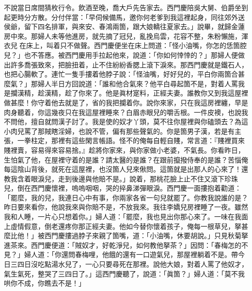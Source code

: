 不說當日席間猜枚行令。飲酒至晚，喬大戶先告家去。西門慶陪吳大舅、伯爵坐到起更時分方散。分付伴當：「早伺候備馬，邀你何老爹到我這裡起身，同往郊外送侯爺，留下四名排軍，與來安、春鴻兩箇，跟大娘轎往夏家去。」說畢，就歸金蓮房中來。那婦人未等他進房，就先摘了冠兒，亂挽烏雲，花容不整，朱粉懶施，渾衣兒𢱉在床上，叫着只不做聲。西門慶便坐在床上問道：「怪小油嘴，你怎的恁箇腔兒？」也不答應。被西門慶用手拉起他來，說道：「你如何悻悻的？」那婦人便做出許多喬張致來，把臉扭着，止不住紛紛香腮上滾下淚來。那西門慶就是鐵石人，也把心腸軟了。{}連忙一隻手摟着他脖子說：「怪油嘴，好好兒的，平白你兩箇合甚麼氣？」那婦人半日方回說道：「誰和他合氣來？他平白尋起箇不是，對着人罵我是攔漢精，趁漢精，{}趁了你來了。他是眞材寔料，正經夫妻。誰教你又到我這屋裡做甚麼！你守着他去就是了，省的我把攔着你。說你來家，只在我這房裡纏，早是肉身聽着，你這幾夜只在我這屋裡睡來？白眉赤眼兒的嚼舌根。一件皮襖，也說我不問他，擅自就問漢子討了。我是使的奴才丫頭，莫不往你屋裡與你磕頭去？為這小肉兒罵了那賊瞎淫婦，也說不管，偏有那些聲氣的。你是箇男子漢，若是有主張，一拳柱定，那裡有這些閑言帳語。怪不的俺每自輕自賤，常言道：『賤裡買來賤裡賣，容易得來容易捨。』趁將你家來，與你家做小老婆，不氣長。你看昨日，生怕氣了他，在屋裡守着的是誰？請太醫的是誰？在跟前攛撥侍奉的是誰？苦惱俺每這陰山背後，就死在這屋裡，也沒箇人兒來偢問。這箇就是出那人的心來了！還教我含着眼淚兒，走到後邊與他賠不是。」{}說着，那桃花臉上止不住又滾下珍珠兒，倒在西門慶懷裡，嗚嗚咽咽，哭的捽鼻涕彈眼淚。西門慶一面摟抱着勸道：「罷麼，我的兒，我連日心中有事，你兩家各省一句兒就罷了。你教我說誰的是？{}昨日要來看你，他說我來與你賠不是，不放我來。我往李嬌兒房裡睡了一夜。雖然我和人睡，一片心只想着你。」婦人道：「罷麼，我也見出你那心來了。一味在我面上虛情假意，倒老還疼你那正經夫妻。他如今替你懷着孩子，俺每一根草兒，拏甚麼比他！」被西門慶摟過脖子來親了箇嘴，道：「小油嘴，休要胡說。」只見秋菊拏進茶來。西門慶便道：「賊奴才，好乾淨兒，如何教他拏茶？」因問：「春梅怎的不見？」婦人道：「你還問春梅哩，他餓的還有一口遊氣兒，那屋裡躺着不是。帶今日三四日沒吃點湯水兒了，一心只要尋死在那裡。說他大娘，對着人罵了他奴才，氣生氣死，整哭了三四日了。」這西門慶聽了，說道：「眞箇？」婦人道：「莫不我哄你不成，你瞧去不是！」

